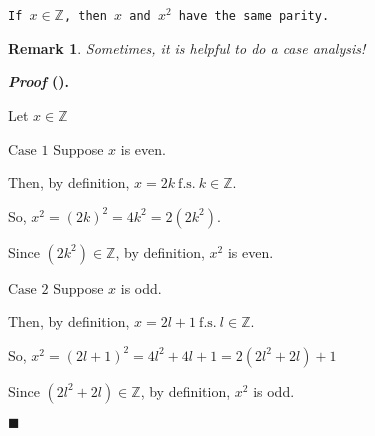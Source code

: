 \documentclass[12pt,a4paper]{article}
\newcounter{nprf}[subsection]
\newtheorem*{rmk}{\indent Remark}
\newenvironment*{prf}{\par\indent\textbf{\textit{Proof} (\stepcounter{nprf}\thenprf). }\par}{\par\hfill $\blacksquare$\par}
\def\Z{{\mathbb{Z}}}
\def\fs{\ \mathrm{f.s.}\ }
\begin{document}
\begin{framed}
\noindent\texttt{If $x\in\Z$, then $x$ and $x^2$ have the same parity.}
\begin{rmk} Sometimes, it is helpful to do a case analysis!\end{rmk}
\begin{prf}
	Let $x\in\Z$\par $\boxed{\text{Case }1}$ Suppose $x$ is even.\par Then, by definition, $x=2k\fs k\in\Z.$\par So, $x^2=(2k)^2=4k^2=2(2k^2)$.\par Since $(2k^2)\in\Z$, by definition, $x^2$ is even. \par $\boxed{\text{Case }2}$ Suppose $x$ is odd.\par Then, by definition, $x=2l+1\fs l\in\Z.$\par So, $x^2=(2l+1)^2=4l^2+4l+1=2(2l^2+2l)+1$\par Since $(2l^2+2l)\in\Z$, by definition, $x^2$ is odd.
\end{prf}
\end{framed}
\end{document}
